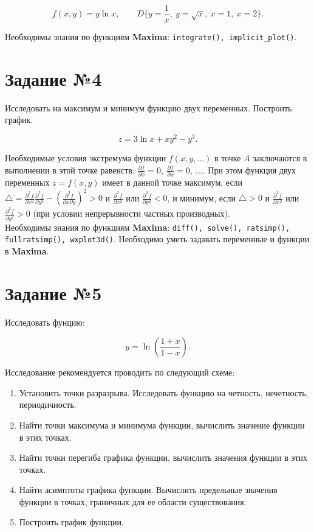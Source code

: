     \[
        f(x,y) = y \ln{x}, \qquad D \{ y = \frac{1}{x}, \: y = \sqrt{x}, \: x = 1, \: x = 2 \}.
    \]

    Необходимы знания по функциям \textbf{Maxima}: {\tt integrate(), implicit\_plot()}.

    \section*{Задание №4}

    Исследовать на максимум и минимум функцию двух переменных. Построить график.

    \[
        z = 3 \ln{x} + x y^{2} - y^{3}.
    \]

    Необходимые условия экстремума функции $f(x, y, \ldots)$ в точке $A$ заключаются в выполнении в этой точке равенств: $\frac{\partial f}{\partial x} = 0, \: \frac{\partial f}{\partial x} = 0, \: \ldots$. При этом функция двух переменных $z = f(x, y)$ имеет в данной точке максимум, если $\triangle = \frac{\partial^{2} f}{\partial x^{2}} \frac{\partial^{2} f}{\partial y^{2}} - \left( \frac{\partial^{2} f}{\partial x \partial y} \right)^2 > 0$ и $\frac{\partial^{2} f}{\partial x^{2}}$ или $\frac{\partial^{2} f}{\partial y^{2}} < 0$, и минимум, если $\triangle > 0$ и $\frac{\partial^{2} f}{\partial x^{2}}$ или $\frac{\partial^{2} f}{\partial y^{2}} > 0$ (при условии непрерывности частных производных).\\

    Необходимы знания по функциям \textbf{Maxima}: {\tt diff(), solve(), ratsimp(), fullratsimp(), wxplot3d()}. Необходимо уметь задавать переменные и функции в \textbf{Maxima}.

    \section*{Задание №5}

    Исследовать фунцию:

    \[
        y = \ln \left( \frac{1 + x}{1 - x} \right).
    \]

    Исследование рекомендуется проводить по следующий схеме:
    
    \begin{enumerate}
        \item Установить точки разразрыва. Исследовать функцию на четность, нечетность, периодичность.
        \item Найти точки максимума и минимума функции, вычислить значение функции в этих точках.
        \item Найти точки перегиба графика функции, вычислить значения функции в этих точках.
        \item Найти асимптоты графика функции. Вычислить предельные значения функции в точках, граничных для ее области существования.
        \item Построить график функции.
    \end{enumerate}
    
